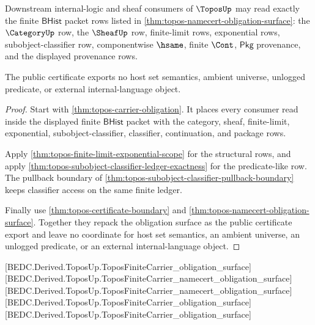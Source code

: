 \begin{theorem}
\label{thm:topos-public-certificate-export}
Downstream internal-logic and sheaf consumers of $\ToposUp$ may read exactly
the finite $\mathsf{BHist}$ packet rows listed in
\autoref{thm:topos-namecert-obligation-surface}: the $\CategoryUp$ row, the
$\SheafUp$ row, finite-limit rows, exponential rows, subobject-classifier row,
componentwise $\hsame$, finite $\Cont$, $\mathsf{Pkg}$ provenance, and the
displayed provenance rows.

The public certificate exports no host set semantics, ambient universe,
unlogged predicate, or external internal-language object.
\end{theorem}
\begin{proof}
Start with \autoref{thm:topos-carrier-obligation}. It places every consumer
read inside the displayed finite $\mathsf{BHist}$ packet with the category,
sheaf, finite-limit, exponential, subobject-classifier, classifier, continuation,
and package rows.

Apply \autoref{thm:topos-finite-limit-exponential-scope} for the structural
rows, and apply \autoref{thm:topos-subobject-classifier-ledger-exactness} for
the predicate-like row. The pullback boundary of
\autoref{thm:topos-subobject-classifier-pullback-boundary} keeps classifier
access on the same finite ledger.

Finally use \autoref{thm:topos-certificate-boundary} and
\autoref{thm:topos-namecert-obligation-surface}. Together they repack the
obligation surface as the public certificate export and leave no coordinate for
host set semantics, an ambient universe, an unlogged predicate, or an external
internal-language object.
\end{proof}

[BEDC.Derived.ToposUp.ToposFiniteCarrier\_obligation\_surface]
[BEDC.Derived.ToposUp.ToposFiniteCarrier\_namecert\_obligation\_surface]
[BEDC.Derived.ToposUp.ToposFiniteCarrier\_namecert\_obligation\_surface]
[BEDC.Derived.ToposUp.ToposFiniteCarrier\_obligation\_surface]
[BEDC.Derived.ToposUp.ToposFiniteCarrier\_obligation\_surface]

